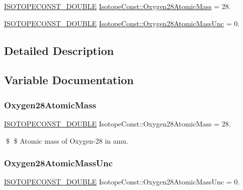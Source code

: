 \begin{DoxyCompactItemize}
\item 
\mbox{\hyperlink{group___isotope_const-_macros_ga8f45a7272ce02c0b4c65c44636ed719a}{I\+S\+O\+T\+O\+P\+E\+C\+O\+N\+S\+T\+\_\+\+D\+O\+U\+B\+LE}} \mbox{\hyperlink{group___isotope_const-_oxygen-_o28_gadc0deee2477559891b23162ba4e5e42b}{Isotope\+Const\+::\+Oxygen28\+Atomic\+Mass}} = 28.
\item 
\mbox{\hyperlink{group___isotope_const-_macros_ga8f45a7272ce02c0b4c65c44636ed719a}{I\+S\+O\+T\+O\+P\+E\+C\+O\+N\+S\+T\+\_\+\+D\+O\+U\+B\+LE}} \mbox{\hyperlink{group___isotope_const-_oxygen-_o28_ga969f7b50f07b575a73eca0d28a195309}{Isotope\+Const\+::\+Oxygen28\+Atomic\+Mass\+Unc}} = 0.
\end{DoxyCompactItemize}


\subsection{Detailed Description}


\subsection{Variable Documentation}
\mbox{\label{group___isotope_const-_oxygen-_o28_gadc0deee2477559891b23162ba4e5e42b}} 
\subsubsection{\texorpdfstring{Oxygen28\+Atomic\+Mass}{Oxygen28AtomicMass}}
{\footnotesize\ttfamily \mbox{\hyperlink{group___isotope_const-_macros_ga8f45a7272ce02c0b4c65c44636ed719a}{I\+S\+O\+T\+O\+P\+E\+C\+O\+N\+S\+T\+\_\+\+D\+O\+U\+B\+LE}} Isotope\+Const\+::\+Oxygen28\+Atomic\+Mass = 28.}

\$ \$ Atomic mass of Oxygen-\/28 in amu. \mbox{\label{group___isotope_const-_oxygen-_o28_ga969f7b50f07b575a73eca0d28a195309}} 
\subsubsection{\texorpdfstring{Oxygen28\+Atomic\+Mass\+Unc}{Oxygen28AtomicMassUnc}}
{\footnotesize\ttfamily \mbox{\hyperlink{group___isotope_const-_macros_ga8f45a7272ce02c0b4c65c44636ed719a}{I\+S\+O\+T\+O\+P\+E\+C\+O\+N\+S\+T\+\_\+\+D\+O\+U\+B\+LE}} Isotope\+Const\+::\+Oxygen28\+Atomic\+Mass\+Unc = 0.}

